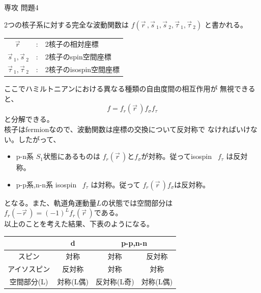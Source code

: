 \documentclass[fleqn]{jbook}
\begin{document}
\begin{answer}{専攻 問題4}{}
\def\Bracket#1#2#3{\langle{#1}|{#2}|{#3}\rangle}
\def\Mean#1{\langle{#1}\rangle}
\def\Vec#1{\vec{#1}\,}

\def\mX{m\ssub{X}}
\def\mY{m\ssub{Y}}
\def\mA{m\ssub{\alpha}}
\def\mG{m\ssub{\gamma}}
\def\pX{\vec{p}\ssub{X}}
\def\pY{\vec{p}\ssub{Y}}
\def\pA{\vec{p}\ssub{\alpha}}
\def\pG{\vec{p}\ssub{\gamma}}


\begin{subanswers}
\SubAnswer
  \begin{subsubanswers}
  \SubSubAnswer
    2つの核子系に対する完全な波動関数は
    $f(\Vec{r},\Vec{s}_1,\Vec{s}_2,\Vec{\tau}_1,\Vec{\tau}_2)$
    と書かれる。

    \begin{tabular}{ccl}
      $\Vec{r}$ &:& 2核子の相対座標 \\
      $\Vec{s}_1,\Vec{s}_2$ &:& 2核子のspin空間座標 \\
      $\Vec{\tau}_1,\Vec{\tau}_2$&:& 2核子のisospin空間座標
    \end{tabular}

    ここでハミルトニアンにおける異なる種類の自由度間の相互作用が
    無視できると、
%
    \[ f = f_{r}(\Vec{r})f_{\sigma}f_{\tau} \]	
%
    と分解できる。\\
%
    核子はfermionなので、波動関数は座標の交換について反対称で
    なければいけない。したがって、
%
    \begin{itemize}
    \item p-n系        $S_{1}$状態にあるものは $f_{r}(\Vec{r})$と$f_{\sigma}$が対称。従ってisospin \ $f_{\tau}$ は反対称。
    \item p-p系,n-n系  isospin \, $f_{\tau}$ は対称。従って $f_{r}(\Vec{r})f_{\sigma}$は反対称。
    \end{itemize}
%
    となる。また、軌道角運動量$L$の状態では空間部分は
    $f_{r}(-\Vec{r})=(-1)^L f_{r}(\Vec{r})$である。\\
%
    以上のことを考えた結果、下表のようになる。

    \begin{tabular}{|c|c|c|c|}\hline
                  & d         & \multicolumn{2}{c|}{p-p,n-n} \\ \hline
     スピン       & 対称      & 対称        & 反対称    \\ \hline
     アイソスピン & 反対称    & 対称        & 対称      \\ \hline
     空間部分(L)  & 対称(L偶) & 反対称(L奇) & 対称(L偶) \\ \hline    
    \end{tabular}


\end{subsubanswers}
\end{subanswers}
\end{answer}
\end{document}
